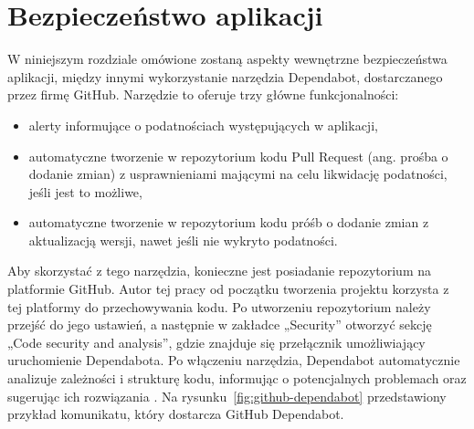 \documentclass[12pt,twoside]{book}
\begin{document}
    \section{Bezpieczeństwo aplikacji}
    W niniejszym rozdziale omówione zostaną aspekty wewnętrzne bezpieczeństwa aplikacji, między innymi wykorzystanie narzędzia Dependabot, dostarczanego przez firmę GitHub. Narzędzie to oferuje trzy główne funkcjonalności:

    \begin{itemize}
        \item alerty informujące o podatnościach występujących w aplikacji,
        \item automatyczne tworzenie w repozytorium kodu Pull Request (ang. prośba o dodanie zmian) z usprawnieniami mającymi na celu likwidację podatności, jeśli jest to możliwe,
        \item automatyczne tworzenie w repozytorium kodu próśb o dodanie zmian z aktualizacją wersji, nawet jeśli nie wykryto podatności.
    \end{itemize}

    Aby skorzystać z tego narzędzia, konieczne jest posiadanie repozytorium na platformie GitHub. Autor tej pracy od początku tworzenia projektu korzysta z tej platformy do przechowywania kodu. Po utworzeniu repozytorium należy przejść do jego ustawień, a następnie w zakładce „Security” otworzyć sekcję „Code security and analysis”, gdzie znajduje się przełącznik umożliwiający uruchomienie Dependabota. Po włączeniu narzędzia, Dependabot automatycznie analizuje zależności i strukturę kodu, informując o potencjalnych problemach oraz sugerując ich rozwiązania \cite{github.dependabot}. Na rysunku~\ref{fig:github-dependabot} przedstawiony przykład komunikatu, który dostarcza GitHub Dependabot.
\end{document}
